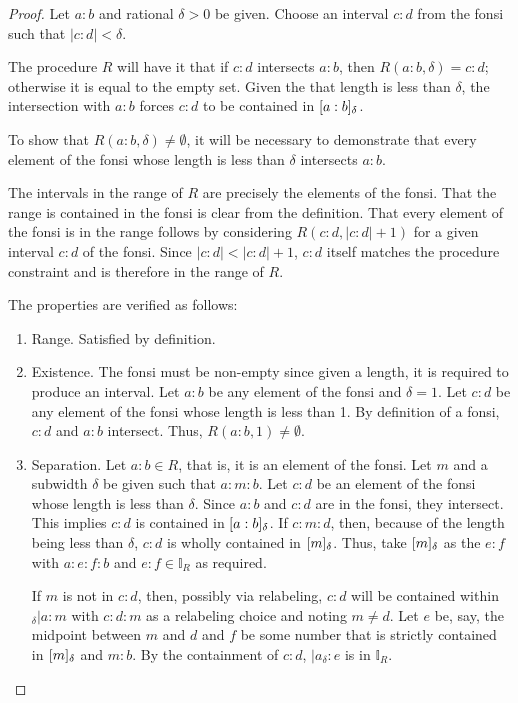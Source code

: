 \documentclass[12pt]{article}
\begin{document}
\begin{proof}
    Let $a:b$ and rational $\delta>0$ be given. Choose an interval $c:d$ from the fonsi such that $|c:d| < \delta$. 

    The procedure $R$ will have it that if $c:d$ intersects $a:b$, then $R(a:b, \delta) = c:d$; otherwise it is equal to the empty set. Given the that length is less than $\delta$, the intersection with $a:b$ forces $c:d$ to be contained in $[a:b]_{\delta}$.

    To show that $R(a:b, \delta) \neq \emptyset$, it will be necessary to demonstrate that every element of the fonsi whose length is less than $\delta$ intersects $a:b$. 
    
    The intervals in the range of $R$ are precisely the elements of the fonsi. That the range is contained in the fonsi is clear from the definition. That every element of the fonsi is in the range follows by considering $R(c:d, |c:d|+1)$ for a given interval $c:d$ of the fonsi. Since $|c:d| < |c:d|+1$, $c:d$ itself matches the procedure constraint and is therefore in the range of $R$. 

    The properties are verified as follows: 
    \begin{enumerate}
        \item Range. Satisfied by definition. 
        \item Existence. The fonsi must be non-empty since given a length, it is required to produce an interval. Let $a:b$ be any element of the fonsi and $\delta =1$. Let $c:d$ be any element of the fonsi whose length is less than 1. By definition of a fonsi, $c:d$ and $a:b$ intersect. Thus, $R(a:b, 1) 
        \neq \emptyset$.
        \item Separation. 
        Let $a:b \in R$, that is, it is an element of the fonsi. Let $m$ and a subwidth $\delta$ be given such that $a:m:b$. Let $c:d$ be an element of the fonsi whose length is less than $\delta$. Since $a:b$ and $c:d$ are in the fonsi, they intersect. This implies $c:d$ is contained in $[a:b]_{\delta}$. If $c:m:d$, then, because of the length being less than $\delta$, $c:d$ is wholly contained in $[m]_{\delta}$. Thus, take $[m]_{\delta}$ as the $e:f$ with $a:e:f:b$ and $e:f \in \mathbb{I}_{R}$ as required. 
        
        If $m$ is not in $c:d$, then, possibly via relabeling, $c:d$ will be contained within ${}_\delta |a:m$ with $c:d:m$ as a relabeling choice and noting $m \neq d$. Let $e$ be, say, the midpoint between $m$ and $d$ and $f$ be some number that is strictly contained in $[m]_{\delta}$ and $m:b$. By the containment of $c:d$, $|a_\delta:e$ is in $\mathbb{I}_R$.
        

\end{enumerate}
\end{proof}
\end{document}
